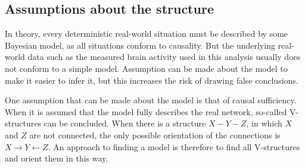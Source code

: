 \documentclass[a4paper, 10pt, english, onecolumn]{article}
\begin{document}


\subsection{Assumptions about the structure}
In theory, every deterministic real-world situation must be described by some Bayesian model, as all situations conform to causality.
But the underlying real-world data such as the measured brain activity used in this analysis usually does not conform to a simple model.
Assumption can be made about the model to make it easier to infer it, but this increases the risk of drawing false conclusions.

One assumption that can be made about the model is that of causal sufficiency. 
When it is assumed that the model fully describes the real network, so-called V-structures can be concluded. 
When there is a structure $X - Y - Z$, in which $X$ and $Z$ are not connected, the only possible orientation of the connections is $X \rightarrow Y \leftarrow Z$. %
An approach to finding a model is therefore to find all V-structures and orient them in this way.
\end{document}
